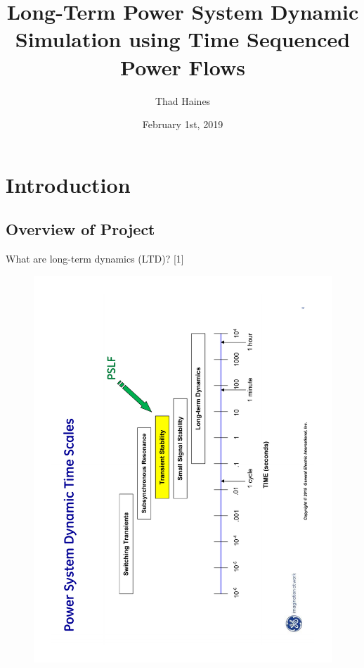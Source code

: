 \documentclass[14pt, unknownkeysallowed]{beamer}
\title{Long-Term Power System Dynamic Simulation using Time Sequenced Power Flows}
\author{Thad Haines}
\institute[MT TECH]{Montana Tech - Master's Thesis Research Project}
\date{February 1st, 2019}
\begin{document}
\begin{frame}
\titlepage
\end{frame}

\section{Introduction}
\subsection{Overview of Project}
\begin{frame}
What are long-term dynamics (LTD)? \tiny[1] \vspace{-2em}\\
\begin{figure}
	\includegraphics[angle=-90,origin=c,width=1.05\linewidth]{GEtimeScales} 
\end{figure}
\end{frame}
\end{document}
